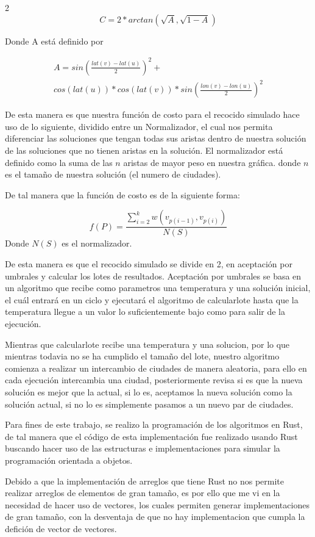 \begin{multicols}{2}
\[
  C = 2 * arctan(\sqrt{A}, \sqrt{1-A})
\]

Donde A está definido por

\[
  \begin{aligned}
  A = sin(\frac{lat(v) - lat(u)}{2})^2 +  \\
  cos(lat(u)) * cos(lat(v)) * sin(\frac{lon(v) - lon(u)}{2})^2
  \end{aligned}
\]

De esta manera es que nuestra función de costo para el recocido simulado hace uso de lo siguiente, dividido entre un Normalizador, el cual nos permita diferenciar las soluciones que tengan todas sus aristas dentro de nuestra solución de las soluciones que no tienen aristas en la solución. El normalizador está definido como la suma de las $n$ aristas de mayor peso en nuestra gráfica. donde $n$ es el tamaño de nuestra solución (el numero de ciudades).

De tal manera que la función de costo es de la siguiente forma:

\[
  f(P) = \frac{\sum^k_{i=2}w(v_{p(i-1)}, v_{p(i)})}{N(S)}
\]
 Donde $N(S)$ es el normalizador. 

 De esta manera es que el recocido simulado se divide en 2, en aceptación por umbrales y calcular los lotes de resultados. Aceptación por umbrales se basa en un algoritmo que recibe como parametros una temperatura y una solución inicial, el cuál entrará en un ciclo y ejecutará el algoritmo de calcularlote hasta que la temperatura llegue a un valor lo suficientemente bajo como para salir de la ejecución.

 Mientras que calcularlote recibe una temperatura y una solucion, por lo que mientras todavia no se ha cumplido el tamaño del lote, nuestro algoritmo comienza a realizar un intercambio de ciudades de manera aleatoria, para ello en cada ejecución intercambia una ciudad, posteriormente revisa si es que la nueva solución es mejor que la actual, si lo es, aceptamos la nueva solución como la solución actual, si no lo es simplemente pasamos a un nuevo par de ciudades.

 Para fines de este trabajo, se realizo la programación de los algoritmos en Rust, de tal manera que el código de esta implementación fue realizado usando Rust buscando hacer uso de las estructuras e implementaciones para simular la programación orientada a objetos.

 Debido a que la implementación de arreglos que tiene Rust no nos permite realizar arreglos de elementos de gran tamaño, es por ello que me vi en la necesidad de hacer uso de vectores, los cuales permiten generar implementaciones de gran tamaño, con la desventaja de que no hay implementacion que cumpla la defición de vector de vectores.


\end{multicols}
